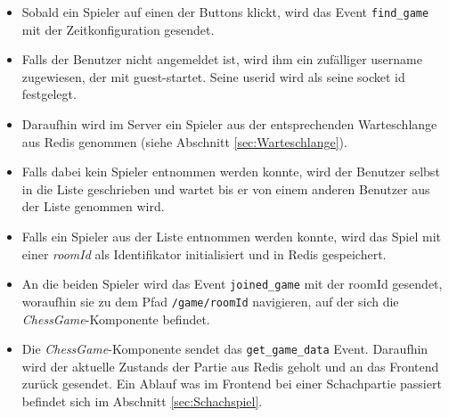 \begin{itemize}
\item Sobald ein Spieler auf einen der Buttons klickt, wird das Event \verb|find_game| mit der Zeitkonfiguration gesendet.
\item Falls der Benutzer nicht angemeldet ist, wird ihm  ein zufälliger username zugewiesen, der mit \glqq guest-\grqq{ }startet. Seine userid wird als seine socket id festgelegt.
\item Daraufhin wird im Server ein Spieler aus der entsprechenden Warteschlange aus Redis genommen (siehe Abschnitt \ref{sec:Warteschlange}).
\item Falls dabei kein Spieler entnommen werden konnte, wird der Benutzer selbst in die Liste geschrieben und wartet bis er von einem anderen Benutzer aus der Liste genommen wird.
\item Falls ein Spieler aus der Liste entnommen werden konnte, wird das Spiel mit einer \textit{roomId} als Identifikator initialisiert und in Redis gespeichert.
\item An die beiden Spieler wird das Event \verb|joined_game| mit der roomId gesendet, woraufhin sie zu dem Pfad \verb|/game/roomId| navigieren, auf der sich die \textit{ChessGame}-Komponente befindet.
\item Die \textit{ChessGame}-Komponente sendet das \verb|get_game_data| Event. Daraufhin wird der aktuelle Zustands der Partie aus Redis geholt und an das Frontend zurück gesendet. Ein Ablauf was im Frontend bei einer Schachpartie passiert befindet sich im Abschnitt \ref{sec:Schachspiel}.
\end{itemize}
      
